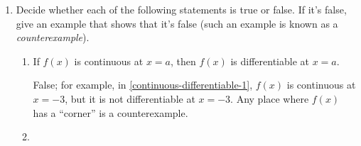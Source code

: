 \documentclass{article}
\begin{document}
\begin{enumerate}[resume]
\begin{minipage}[t]{\linewidth-2.2in}
\begin{enumerate}
      \begin{solution}
        It has a removable discontinuity at $x = -2$, a jump discontinuity at $x = 1$, a vertical asymptote at $x = 2$, and another removable discontinuity at $x = 3$.
      \end{solution}

    \item


      \begin{problem}[0.75in]
        At what values of $x$ in $(-4, 4)$ is $f(x)$ \textit{not} differentiable?
      \end{problem}

      \begin{solution}
        It is not differentiable at $x = -3$, $x = -2$, $x = -1$, $x = 1$, $x = 2$, and $x = 3$.
      \end{solution}

    \end{enumerate}    
  \end{minipage}

  \pspace{\newpage}

\item  \label{continuity-differentiability-relationship}

  Decide whether each of the following statements is true or false. If it's false, give an example that shows that it's false (such an example is known as a \textit{counterexample}). 
  \begin{enumerate}
  \item
    \begin{problem}[1in]
      If $f(x)$ is continuous at $x = a$, then $f(x)$ is differentiable at $x = a$.
    \end{problem}

    \begin{solution}
      False; for example, in \ref{continuous-differentiable-1}, $f(x)$ is continuous at $x = -3$, but it is not differentiable at $x = -3$. Any place where $f(x)$ has a ``corner'' is a counterexample.
    \end{solution}

  \item


\end{enumerate}
\end{enumerate}
\end{document}
